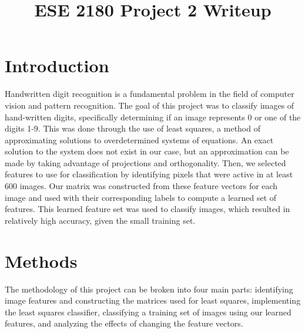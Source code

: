\documentclass[conference]{IEEEtran}
\begin{document}
\title{ESE 2180 Project 2 Writeup}

\author{
\and
{}
\and
}

\maketitle


\section{Introduction}
Handwritten digit recognition is a fundamental problem in the field of computer vision and pattern recognition. The goal of this project was to classify images of hand-written digits, specifically determining if an image represents 0 or one of the digits 1-9. This was done through the use of least squares, a method of approximating solutions to overdetermined systems of equations. An exact solution to the system does not exist in our case, but an approximation can be made by taking advantage of projections and orthogonality. Then, we selected features to use for classification by identifying pixels that were active in at least 600 images. Our matrix was constructed from these feature vectors for each image and used with their corresponding labels to compute a learned set of features. This learned feature set was used to classify images, which resulted in relatively high accuracy, given the small training set. 

\section{Methods}
The methodology of this project can be broken into four main parts: identifying image features and constructing the matrices used for least squares, implementing the least squares classifier, classifying a training set of images using our learned features, and analyzing the effects of changing the feature vectors. 
\end{document}
